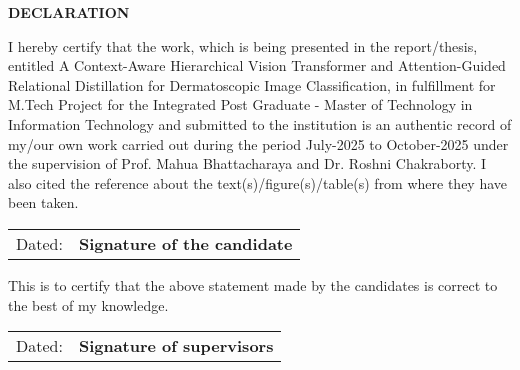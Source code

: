 
\begin{center}
{\Large \bf DECLARATION}
\end{center}
\vspace{0.5cm}
\noindent I hereby certify that the work, which is being presented in the report/thesis, entitled A Context-Aware Hierarchical Vision Transformer and Attention-Guided Relational Distillation for Dermatoscopic Image Classification, in fulfillment for M.Tech Project for the Integrated Post Graduate - Master of Technology in Information Technology and submitted to the institution is an authentic record of my/our own work carried out during the period July-2025 to October-2025 under the supervision of Prof. Mahua Bhattacharaya and Dr. Roshni Chakraborty. I also cited the reference about the text(s)/figure(s)/table(s) from where they have been taken.

\vspace{1cm}

\begin{center}
	\begin{tabular}{p{}p{}}
		Dated:  & {\bf{Signature of the candidate}} \\	
	\end{tabular}
\end{center}
\vspace{1.5cm}
\noindent This is to certify that the above statement made by the candidates is correct to the best of my knowledge.

\vspace{1.5cm}

\begin{center}
	\begin{tabular}{p{}p{}}
		Dated: & {\bf{Signature of supervisors}} \\	
	\end{tabular}
\end{center}


%
%
%
